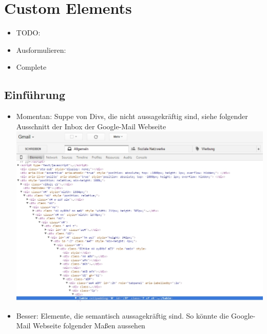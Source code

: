 \documentclass[11pt,a4paper]{report}
\date{}
\providecommand{\tightlist}{%
  \setlength{\itemsep}{0pt}\setlength{\parskip}{0pt}}
\begin{document}






\chapter{Custom Elements}\label{custom-elements}

\begin{itemize}
\item
  TODO:
\item
  Ausformulieren:
\item
  Complete
\end{itemize}

\section{Einführung}\label{einfuxfchrung}

\begin{itemize}
\tightlist
\item
  Momentan: Suppe von Divs, die nicht aussagekräftig sind, siehe
  folgender Ausschnitt der Inbox der Google-Mail Webseite
  \includegraphics{images/1-custom-elements-div-suppe.jpg}
\item
  Besser: Elemente, die semantisch aussagekräftig sind. So könnte die
  Google-Mail Webseite folgender Maßen aussehen
\end{itemize}
\end{document}
